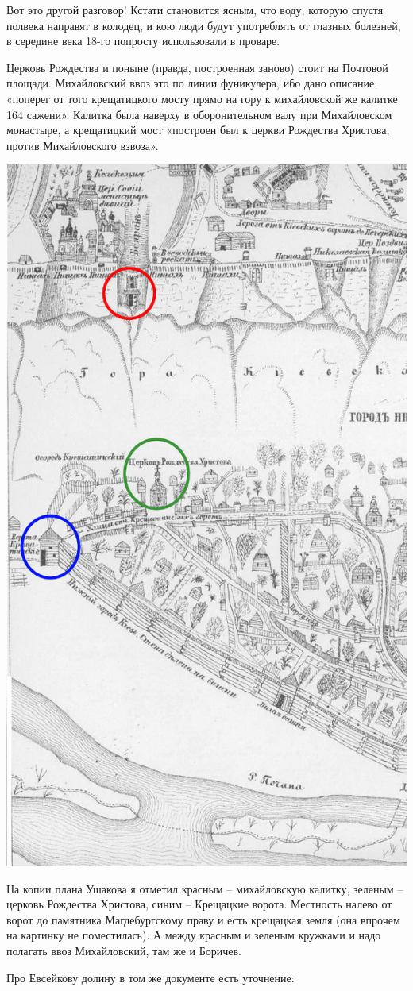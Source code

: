 Вот это другой разговор! Кстати становится ясным, что воду, которую спустя полвека направят в колодец, и кою люди будут употреблять от глазных болезней, в середине века 18-го попросту использовали в проваре.

Церковь Рождества и поныне (правда, построенная заново) стоит на Почтовой площади. Михайловский ввоз это по линии фуникулера, ибо дано описание: «поперег от того крещатицкого мосту прямо на гору к михайловской же калитке 164 сажени». Калитка была наверху в оборонительном валу при Михайловском монастыре, а крещатицкий мост «построен был к церкви Рождества Христова, против Михайловского взвоза».

\begin{center}
\includegraphics[width=0.60\linewidth]{chast-colebanie-osnov/pochayna/1695-kr.jpg}
\end{center}

На копии плана Ушакова я отметил красным – михайловскую калитку, зеленым – церковь Рождества Христова, синим – Крещацкие ворота. Местность налево от ворот до памятника Магдебургскому праву и есть крещацкая земля (она впрочем на картинку не поместилась). А между красным и зеленым кружками и надо полагать ввоз Михайловский, там же и Боричев.

Про Евсейкову долину в том же документе есть уточнение:

